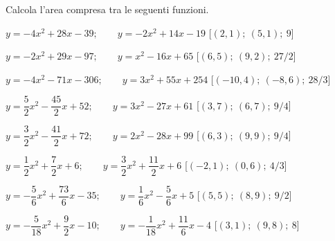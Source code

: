 \begin{esercizio}\label{ese:03.1}
Calcola l'area compresa tra le seguenti funzioni.
 \begin{enumeratea}
\item \(y=-4x^2 +28x -39; \qquad y=-2x^2 +14x -19\) \hfill [\((2, 1);~(5, 
1);~9\)]
\item \(y=-2x^2 +29x -97; \qquad y=x^2 -16x +65\) \hfill [\((6, 5);~(9, 
2);~27/2\)]
\item \(y=-4x^2 -71x -306; \qquad y=3x^2 +55x +254\) \hfill [\((-10, 
4);~(-8, 6);~28/3\)]
\item \(y=\dfrac{5}{2}x^2 -\dfrac{45}{2}x +52; \qquad y=3x^2 -27x +61\) 
\hfill [\((3, 7);~(6, 7);~9/4\)]
\item \(y=\dfrac{3}{2}x^2 -\dfrac{41}{2}x +72; \qquad y=2x^2 -28x +99\) 
\hfill [\((6, 3);~(9, 9);~9/4\)]
\item \(y=\dfrac{1}{2}x^2 +\dfrac{7}{2}x +6; \qquad y=\dfrac{3}{2}x^2 
+\dfrac{11}{2}x +6\) \hfill [\((-2, 1);~(0, 6);~4/3\)]
\item \(y=-\dfrac{5}{6}x^2 +\dfrac{73}{6}x -35; \qquad y=\dfrac{1}{6}x^2 
-\dfrac{5}{6}x +5\) \hfill [\((5, 5);~(8, 9);~9/2\)]
\item \(y=-\dfrac{5}{18}x^2 +\dfrac{9}{2}x -10; \qquad y=-\dfrac{1}{18}x^2 
+\dfrac{11}{6}x -4\) \hfill [\((3, 1);~(9, 8);~8\)]

\end{enumeratea}
\end{esercizio}
